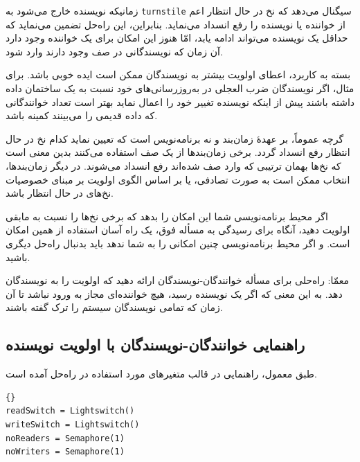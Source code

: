 \documentclass{book}
\newcommand{\clearemptydoublepage}{\newpage\cleardoublepage}
\begin{document}
    زمانیکه نویسنده خارج می‌شود  به {\tt turnstile} سیگنال می‌دهد که نخ‌ در حال انتظار اعم از خواننده یا نویسنده را رفع انسداد می‌نماید. 
    بنابراین، این راه‌حل تضمین می‌نماید که حداقل یک نویسنده می‌تواند ادامه یابد، امّا هنوز این امکان برای یک خواننده وجود دارد آن زمان که 
    نویسندگانی در صف وجود دارند وارد شود. 
    
    بسته به کاربرد، اعطای اولویت بیشتر به نویسندگان ممکن است ایده خوبی باشد. برای مثال، اگر نویسندگان ضرب العجلی در به‌روزرسانی‌های خود 
    نسبت به یک ساختمان داده‌ داشته باشند 
    پیش از اینکه نویسنده تغییر خود را اعمال نماید بهتر است تعداد خوانندگانی که داده قدیمی را می‌بینند کمینه باشد. 

    گرچه عموماً، بر عهدهٔ زمان‌بند و نه برنامه‌نویس است که تعیین نماید کدام نخ در حال انتظار رفع انسداد گردد. 
    برخی زمان‌بندها از یک صف  استفاده می‌کنند بدین معنی است که نخ‌ها بهمان ترتیبی که 
    وارد صف شده‌اند رفع انسداد می‌شوند. در دیگر زمان‌بندها، انتخاب ممکن است به صورت تصادفی، یا بر اساس الگوی اولویت  
    بر مبنای خصوصیات نخ‌های در حال انتظار باشد. 

    اگر محیط برنامه‌نویسی شما این امکان را بدهد که برخی نخ‌ها را نسبت به مابقی اولویت دهید، آنگاه برای رسیدگی به مسأله فوق، یک راه آسان استفاده از همین امکان است. 
    و اگر محیط برنامه‌نویسی چنین امکانی را به شما ندهد باید بدنبال راه‌حل دیگری باشید. 

    معمّا: راه‌حلی برای مسأله خوانندگان-نویسندگان ارائه دهید که اولویت را به نویسندگان  دهد. به این معنی که اگر یک نویسنده رسید، هیچ خواننده‌ای  
    مجاز به ورود نباشد تا آن زمان که تمامی نویسندگان سیستم را ترک گفته باشند. 


\clearemptydoublepage
\subsection{راهنمایی خوانندگان-نویسندگان با اولویت نویسنده}

    طبق معمول،‌ راهنمایی در قالب متغیرهای مورد استفاده در راه‌حل آمده است. 

\begin{latin}
\begin{lstlisting}[title=\rl{مقداردهی اولیه خوانندگان-نویسندگان با اولویت نویسنده}]{}
readSwitch = Lightswitch()
writeSwitch = Lightswitch()
noReaders = Semaphore(1)
noWriters = Semaphore(1)
\end{lstlisting}
\end{latin}

\end{document}
